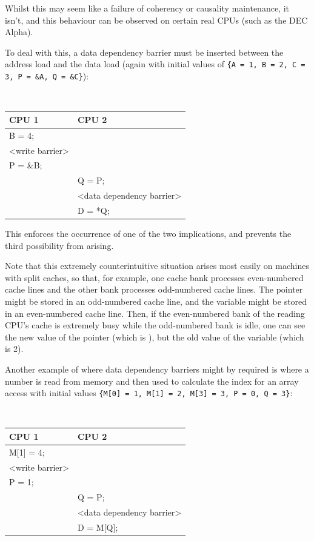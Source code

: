 Whilst this may seem like a failure of coherency or causality maintenance, it
isn't, and this behaviour can be observed on certain real CPUs (such as the DEC
Alpha).

To deal with this, a data dependency barrier must be inserted between the
address load and the data load (again with initial values of
{\tt \{A = 1, B = 2, C = 3, P = \&A, Q = \&C\}}):

\vspace{5pt}
\begin{minipage}[t]{\columnwidth}
\tt
\scriptsize
\begin{tabular}{l|p{1.5in}}
	CPU 1 &		CPU 2 \\
	\hline
	B = 4; & \\
	<write barrier> & \\
	P = \&B; &	\\
		&	Q = P; \\
		&	<data dependency barrier> \\
		&	D = *Q; \\
\end{tabular}
\end{minipage}
\vspace{5pt}

This enforces the occurrence of one of the two implications, and prevents the
third possibility from arising.

Note that this extremely counterintuitive situation arises most easily on
machines with split caches, so that, for example, one cache bank processes
even-numbered cache lines and the other bank processes odd-numbered cache
lines.
The pointer  might be stored in an odd-numbered cache line, and the
variable  might be stored in an even-numbered cache line.  Then, if the
even-numbered bank of the reading CPU's cache is extremely busy while the
odd-numbered bank is idle, one can see the new value of the
pointer  (which is ),
but the old value of the variable  (which is 2).

Another example of where data dependency barriers might by required is where a
number is read from memory and then used to calculate the index for an array
access with initial values
{\tt \{M[0] = 1, M[1] = 2, M[3] = 3, P = 0, Q = 3\}}:

\vspace{5pt}
\begin{minipage}[t]{\columnwidth}
\tt
\scriptsize
\begin{tabular}{l|p{1.5in}}
	CPU 1 &		CPU 2 \\
	\hline
	M[1] = 4; & \\
	<write barrier> & \\
	P = 1;	&	\\
		&	Q = P; \\
		&	<data dependency barrier> \\
		&	D = M[Q]; \\
\end{tabular}
\end{minipage}
\vspace{5pt}

